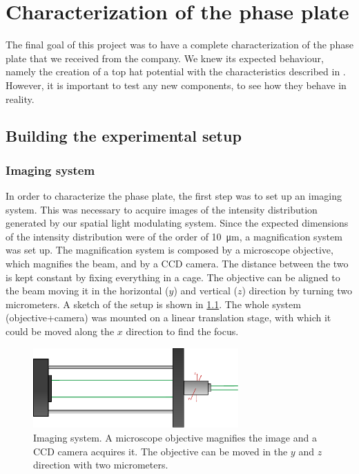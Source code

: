 \chapter{Characterization of the phase plate}
The final goal of this project was to have a complete characterization of the phase plate that we received from the company. We knew its expected behaviour, namely the creation of a top hat potential with the characteristics described in . However, it is important to test any new components, to see how they behave in reality.

\section{Building the experimental setup}
\subsection{Imaging system}
In order to characterize the phase plate, the first step was to set up an imaging system. This was necessary to acquire images of the intensity distribution generated by our spatial light modulating system. Since the expected dimensions of the intensity distribution were of the order of \SI{10}{\micro\meter}, a magnification system was set up. The magnification system is composed by a microscope objective, which magnifies the beam, and by a CCD camera. The distance between the two is kept constant by fixing everything in a cage. The objective can be aligned to the beam moving it in the horizontal ($y$) and vertical ($z$) direction by turning two micrometers. A sketch of the setup is shown in \cref{fig:imaging}. The whole system (objective+camera) was mounted on a linear translation stage, with which it could be moved along the $x$ direction to find the focus.

\begin{figure}
    \centering
    \includegraphics[width=0.7\textwidth]{chapters/chapter_3/figures/imaging}
    \caption{Imaging system. A microscope objective magnifies the image and a CCD camera acquires it. The objective can be moved in the $y$ and $z$ direction with two micrometers.}
    \label{fig:imaging}
\end{figure}


